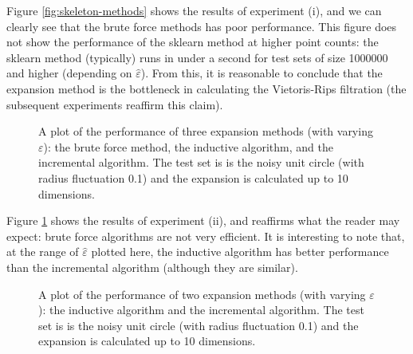 Figure \ref{fig:skeleton-methods} shows the results of experiment (i), and we can clearly see that the brute force methods has poor performance. This figure does not show the performance of the sklearn method at higher point counts: the sklearn method (typically) runs in under a second for test sets of size \num{1000000} and higher (depending on $\hat\varepsilon$). From this, it is reasonable to conclude that the expansion method is the bottleneck in calculating the Vietoris-Rips filtration (the subsequent experiments reaffirm this claim).

\begin{figure}
    \caption{A plot of the performance of three expansion methods (with varying $\varepsilon$): the brute force method, the inductive algorithm, and the incremental algorithm. The test set is is the noisy unit circle (with radius fluctuation 0.1) and the expansion is calculated up to 10 dimensions.}
    \label{fig:initial-expansion-methods}
\end{figure}

Figure \ref{fig:initial-expansion-methods} shows the results of experiment (ii), and reaffirms what the reader may expect: brute force algorithms are not very efficient. It is interesting to note that, at the range of $\hat\varepsilon$ plotted here, the inductive algorithm has better performance than the incremental algorithm (although they are similar).

\begin{figure}
    \caption{A plot of the performance of two expansion methods (with varying $\varepsilon$): the inductive algorithm and the incremental algorithm. The test set is is the noisy unit circle (with radius fluctuation 0.1) and the expansion is calculated up to 10 dimensions.}
    \label{fig:expansion-methods}
\end{figure}

